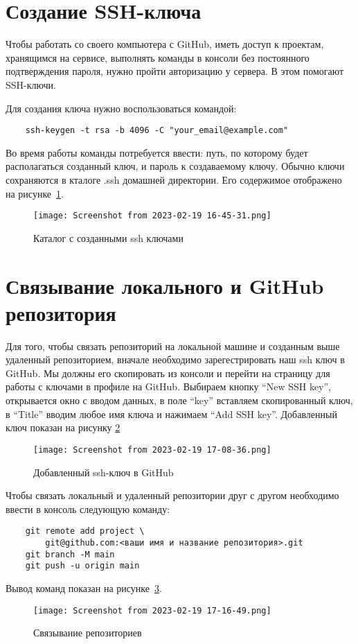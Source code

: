 \section{Создание SSH-ключа}
Чтобы работать со своего компьютера с GitHub, иметь доступ к проектам,
хранящимся на сервисе, выполнять команды в консоли без постоянного
подтверждения пароля, нужно пройти авторизацию у сервера.
В этом помогают SSH-ключи.

Для создания ключа нужно воспользоваться командой:
\begin{verbatim}
	ssh-keygen -t rsa -b 4096 -C "your_email@example.com"
\end{verbatim}

Во время работы команды потребуется ввести: путь, по которому будет
располагаться созданный ключ, и пароль к создаваемому ключу.
Обычно ключи сохраняются в кталоге .ssh домашней директории. Его содержимое
отображено на рисунке~\ref{2:fig:ssh-key}.

\begin{figure}[h!tp]
	\centering
	\texttt{[image: Screenshot from 2023-02-19 16-45-31.png]}
	\caption{Каталог с созданными ssh ключами}
	\label{2:fig:ssh-key}
\end{figure}

\section{Связывание локального и GitHub репозитория}
Для того, чтобы связать репозиторий на локальной машине и созданным выше
удаленный репозиторием, вначале необходимо зарегестрировать
наш ssh ключ в GitHub. Мы должны его скопировать из консоли
и перейти на страницу для работы с ключами в профиле на GitHub.
Выбираем кнопку “New SSH key”, открывается окно с вводом данных, в поле “key”
вставляем скопированный ключ, в “Title” вводим любое
имя ключа и нажимаем “Add SSH key”.
Добавленный ключ показан на рисунку \ref{2:fig:GitHub:add_ssh-key}
\begin{figure}[h!tp]
	\centering
	\texttt{[image: Screenshot from 2023-02-19 17-08-36.png]}
	\caption{Добавленный ssh-ключ в GitHub}
	\label{2:fig:GitHub:add_ssh-key}
\end{figure}

Чтобы связать локальный и удаленный репозитории друг с другом необходимо
ввести в консоль следующую команду:
\begin{verbatim}
	git remote add project \
		git@github.com:<ваши имя и название репозитория>.git
	git branch -M main
	git push -u origin main
\end{verbatim}
Вывод команд показан на рисунке~\ref{2:fig:git:remote}.
\begin{figure}[h!tp]
	\centering
	\texttt{[image: Screenshot from 2023-02-19 17-16-49.png]}
	\caption{Связывание репозиториев}
	\label{2:fig:git:remote}
\end{figure}

